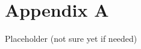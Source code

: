 \chapter{Appendix A}
\label{sec:appendix_a}

Placeholder (not sure yet if needed)

\cite{Vasiljevic2014a}